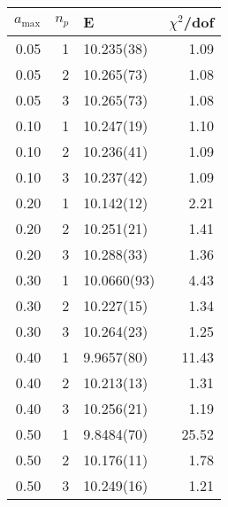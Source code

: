 \begin{tabular}{rrlr}
\hline
   $a_\textrm{max}$ &   $n_p$ & E           &   $\chi^2$/dof \\
\hline
               0.05 &       1 & 10.235(38)  &           1.09 \\
               0.05 &       2 & 10.265(73)  &           1.08 \\
               0.05 &       3 & 10.265(73)  &           1.08 \\
               0.10 &       1 & 10.247(19)  &           1.10 \\
               0.10 &       2 & 10.236(41)  &           1.09 \\
               0.10 &       3 & 10.237(42)  &           1.09 \\
               0.20 &       1 & 10.142(12)  &           2.21 \\
               0.20 &       2 & 10.251(21)  &           1.41 \\
               0.20 &       3 & 10.288(33)  &           1.36 \\
               0.30 &       1 & 10.0660(93) &           4.43 \\
               0.30 &       2 & 10.227(15)  &           1.34 \\
               0.30 &       3 & 10.264(23)  &           1.25 \\
               0.40 &       1 & 9.9657(80)  &          11.43 \\
               0.40 &       2 & 10.213(13)  &           1.31 \\
               0.40 &       3 & 10.256(21)  &           1.19 \\
               0.50 &       1 & 9.8484(70)  &          25.52 \\
               0.50 &       2 & 10.176(11)  &           1.78 \\
               0.50 &       3 & 10.249(16)  &           1.21 \\
\hline
\end{tabular}
